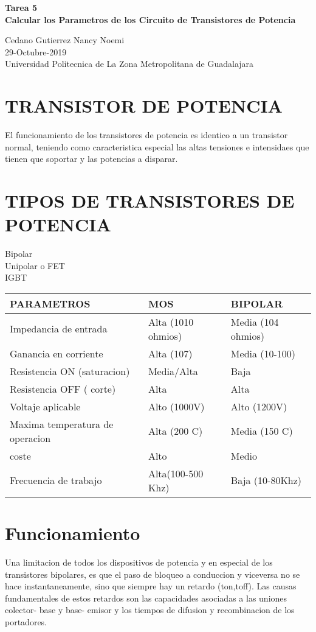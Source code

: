 \documentclass[11pt,a4paper]{article}
\begin{document}
\begin{center}
\textbf{Tarea 5\\Calcular los Parametros de los Circuito de Transistores de Potencia}\

\end{center}

\begin{center}
Cedano Gutierrez Nancy Noemi\\
29-Octubre-2019\\
Universidad Politecnica de La Zona Metropolitana de Guadalajara
\end{center}
\section{TRANSISTOR DE POTENCIA}
El funcionamiento de los transistores de potencia es identico a un transistor normal, teniendo como caracteristica especial las altas tensiones e intensidaes  que tienen que soportar y las potencias a disparar.\\
\section{TIPOS DE TRANSISTORES DE POTENCIA}
Bipolar\\
Unipolar o FET\\
IGBT\\

\begin{tabular}{|p{50mm}|p{40mm}|p{40mm}|}
\hline
	PARAMETROS & MOS & BIPOLAR \\
\hline
	Impedancia de entrada & Alta (1010 ohmios) & Media (104 ohmios)\\
\hline
	Ganancia en corriente & Alta (107) & Media (10-100) \\
\hline
	Resistencia ON (saturacion)& Media/Alta & Baja \\
\hline
	Resistencia OFF ( corte) & Alta & Alta \\
\hline
	Voltaje aplicable & Alto (1000V) & Alto (1200V)\\
\hline
	Maxima temperatura de operacion & Alta (200  C) & Media (150 C)\\
\hline
	coste & Alto & Medio\\
\hline
	Frecuencia de trabajo & Alta(100-500 Khz) & Baja (10-80Khz)
	
\end{tabular}

\section{Funcionamiento}
Una limitacion de todos los dispositivos de potencia y en especial de los transistores bipolares, es que el paso de bloqueo a conduccion y viceversa no se hace instantaneamente, sino que siempre hay un retardo (ton,toff). Las causas fundamentales de estos retardos son las capacidades asociadas a las uniones colector- base y base- emisor y los tiempos de difusion y recombinacion de los portadores.\\
\end{document}
